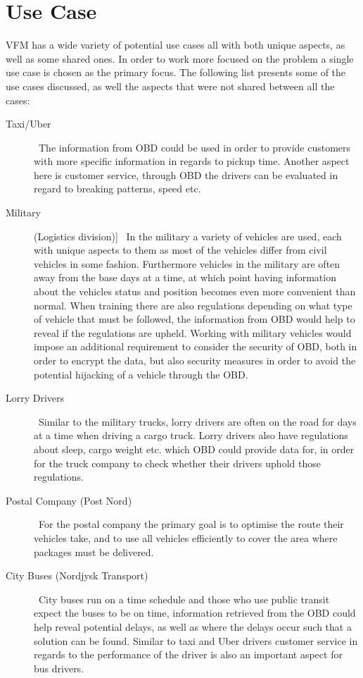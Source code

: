 \section{Use Case}
\acl{VFM} has a wide variety of potential use cases all with both unique aspects, as well as some shared ones.
In order to work more focused on the problem a single use case is chosen as the primary focus.
The following list presents some of the use cases discussed, as well the aspects that were not shared between all the cases:
\begin{description}
	\item [Taxi/Uber] \hfill \
	The information from \ac{OBD} could be used in order to provide customers with more specific information in regards to pickup time.
	Another aspect here is customer service, through \ac{OBD} the drivers can be evaluated in regard to breaking patterns, speed etc.
	\item [Military] (Logistics division)] \hfill \
	In the military a variety of vehicles are used, each with unique aspects to them as most of the vehicles differ from civil vehicles in some fashion.
	Furthermore vehicles in the military are often away from the base days at a time, at which point having information about the vehicles status and position becomes even more convenient than normal.
	When training there are also regulations depending on what type of vehicle that must be followed, the information from \ac{OBD} would help to reveal if the regulations are upheld.
	Working with military vehicles would impose an additional requirement to consider the security of \ac{OBD}, both in order to encrypt the data, but also security measures in order to avoid the potential hijacking of a vehicle through the \ac{OBD}.
	\item [Lorry Drivers] \hfill \
	Similar to the military trucks, lorry drivers are often on the road for days at a time when driving a cargo truck.
	Lorry drivers also have regulations about sleep, cargo weight etc. which \ac{OBD} could provide data for, in order for the truck company to check whether their drivers uphold those regulations.
	\item [Postal Company (Post Nord)] \hfill \
	For the postal company the primary goal is to optimise the route their vehicles take, and to use all vehicles efficiently to cover the area where packages must be delivered.
	\item [City Buses (Nordjysk Transport)] \hfill \
	City buses run on a time schedule and those who use public transit expect the buses to be on time, information retrieved from the \ac{OBD} could help reveal potential delays, as well as where the delays occur such that a solution can be found.
	Similar to taxi and Uber drivers customer service in regards to the performance of the driver is also an important aspect for bus drivers.
\end{description}

